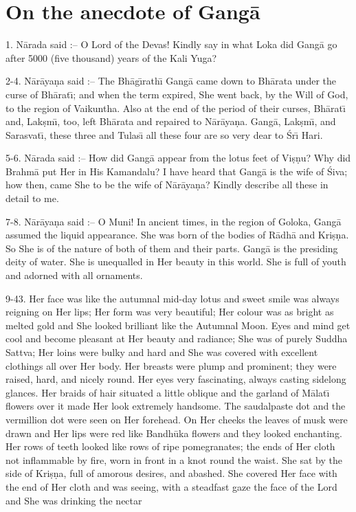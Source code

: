 \chapter{On the anecdote of Gang\=a}

1. N\=arada said :-- O Lord of the Devas! Kindly say in what Loka did Gang\=a go after 5000 (five thousand) years of the Kali Yuga?

2-4. N\=ar\=aya\d{n}a said :-- The Bh\=ag\={\i}rath\={\i} Gang\=a came down to Bh\=arata under the curse of Bh\=arat\={\i}; and when the term expired, She went back, by the Will of God, to the region of Vaikuntha. Also at the end of the period of their curses, Bh\=arat\={\i} and, Lak\d{s}m\={\i}, too, left Bh\=arata and repaired to N\=ar\=aya\d{n}a. Gang\=a, Lak\d{s}m\={\i}, and Sarasvat\={\i}, these three and Tulas\={\i} all these four are so very dear to \'Sr\={\i} Hari.

5-6. N\=arada said :-- How did Gang\=a appear from the lotus feet of Vi\d{s}\d{n}u? Why did Brahm\=a put Her in His Kamandalu? I have heard that Gang\=a is the wife of \'Siva; how then, came She to be the wife of N\=ar\=aya\d{n}a? Kindly describe all these in detail to me.

7-8. N\=ar\=aya\d{n}a said :-- O Muni! In ancient times, in the region of Goloka, Gang\=a assumed the liquid appearance. She was born of the bodies of R\=adh\=a and Kri\d{s}\d{n}a. So She is of the nature of both of them and their parts. Gang\=a is the presiding deity of water. She is unequalled in Her beauty in this world. She is full of youth and adorned with all ornaments.

9-43. Her face was like the autumnal mid-day lotus and sweet smile was always reigning on Her lips; Her form was very beautiful; Her colour was as bright as melted gold and She looked brilliant like the Autumnal Moon. Eyes and mind get cool and become pleasant at Her beauty and radiance; She was of purely Suddha Sattva; Her loins were bulky and hard and She was covered with excellent clothings all over Her body. Her breasts were plump and prominent; they were raised, hard, and nicely round. Her eyes very fascinating, always casting sidelong glances. Her braids of hair situated a little oblique and the garland of M\=alat\={\i} flowers over it made Her look extremely handsome. The saudalpaste dot and the vermillion dot were seen on Her forehead. On Her cheeks the leaves of musk were drawn and Her lips were red like Bandh\=uka flowers and they looked enchanting. Her rows of teeth looked like rows of ripe pomegranates; the ends of Her cloth not inflammable by fire, worn in front in a knot round the waist. She sat by the side of Kri\d{s}\d{n}a, full of amorous desires, and abashed. She covered Her face with the end of Her cloth and was seeing, with a steadfast gaze the face of the Lord and She was drinking the nectar

